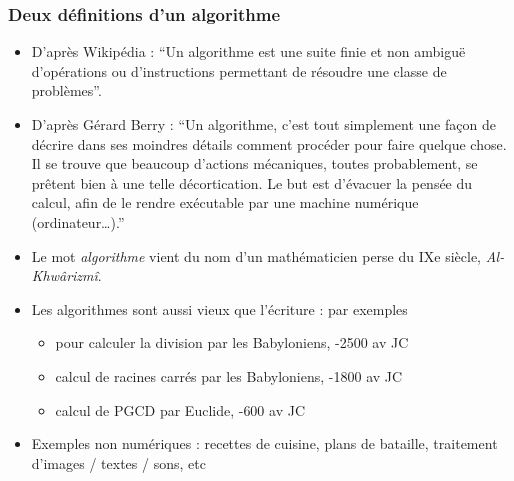 \documentclass{beamer}
\begin{document}
\frame
{
  \frametitle{Deux définitions d'un algorithme}

  \footnotesize{
  \begin{itemize}
    \item
    D'après Wikipédia : ``Un algorithme est une suite finie et non ambiguë d'opérations ou d'instructions permettant de résoudre une classe de problèmes''.

    \item
    D'après Gérard Berry : ``Un algorithme, c'est tout simplement une façon de décrire dans ses moindres détails comment procéder pour faire quelque chose. Il se trouve que beaucoup d'actions mécaniques, toutes probablement, se prêtent bien à une telle décortication. Le but est d'évacuer la pensée du calcul, afin de le rendre exécutable par une machine numérique (ordinateur…).''

    \item
    Le mot \textit{algorithme} vient du nom d'un mathématicien perse du IXe siècle, \textit{Al-Khwârizmî}.

    \item
    Les algorithmes sont aussi vieux que l'écriture : par exemples
    \begin{itemize}
      \item pour calculer la division par les Babyloniens, -2500 av JC
      \item calcul de racines carrés par les Babyloniens, -1800 av JC
      \item calcul de PGCD par Euclide, -600 av JC
    \end{itemize}

    \item
    Exemples non numériques : recettes de cuisine, plans de bataille, traitement d'images / textes / sons, etc
  \end{itemize}
  }
}
\end{document}
